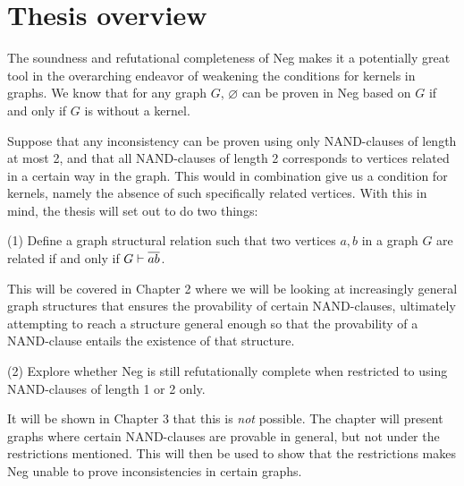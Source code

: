 \section{Thesis overview}
\label{sec:Thesis overview}
The soundness and refutational completeness of Neg makes it a potentially great tool in the overarching endeavor of weakening the conditions for kernels in graphs.
We know that for any graph $G$, $\varnothing$ can be proven in Neg based on $G$ if and only if $G$ is without a kernel.

Suppose that any inconsistency can be proven using only NAND-clauses of length at most 2, and that all NAND-clauses of length 2 corresponds to vertices related in a certain way in the graph.
This would in combination give us a condition for kernels, namely the absence of such specifically related vertices.
With this in mind, the thesis will set out to do two things:

(1) Define a graph structural relation such that two vertices $a,b$ in a graph $G$ are related if and only if $G \vdash \ol{ab}$.

This will be covered in Chapter 2 where we will be looking at increasingly general graph structures that ensures the provability of certain NAND-clauses, ultimately attempting to reach a structure general enough so that the provability of a NAND-clause entails the existence of that structure.

(2) Explore whether Neg is still refutationally complete when restricted to using NAND-clauses of length 1 or 2 only.

It will be shown in Chapter 3 that this is \textit{not} possible.
The chapter will present graphs where certain NAND-clauses are provable in general, but not under the restrictions mentioned.
This will then be used to show that the restrictions makes Neg unable to prove inconsistencies in certain graphs.
